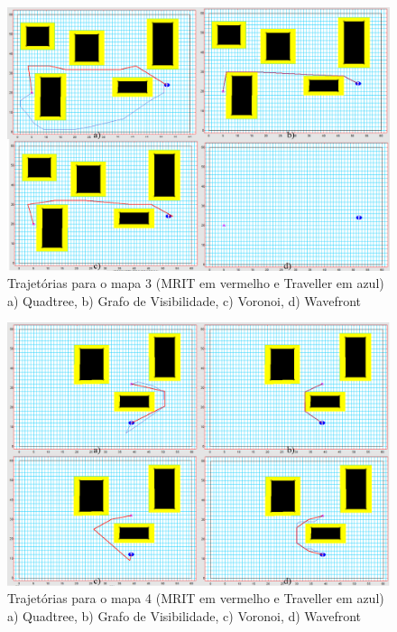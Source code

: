 \begin{figure}[h]
	\centering
	\label{fig41}
		\includegraphics[keepaspectratio=true,scale=0.25]{figuras/mapa3.jpg}
	\caption{Trajetórias para o mapa 3 (MRIT em vermelho e Traveller em azul) a) Quadtree, b) Grafo de Visibilidade, c) Voronoi, d) Wavefront}
\end{figure}

\begin{figure}[h]
	\centering
	\label{fig42}
		\includegraphics[keepaspectratio=true,scale=0.25]{figuras/mapa4.jpg}
	\caption{Trajetórias para o mapa 4 (MRIT em vermelho e Traveller em azul) a) Quadtree, b) Grafo de Visibilidade, c) Voronoi, d) Wavefront}
\end{figure}

